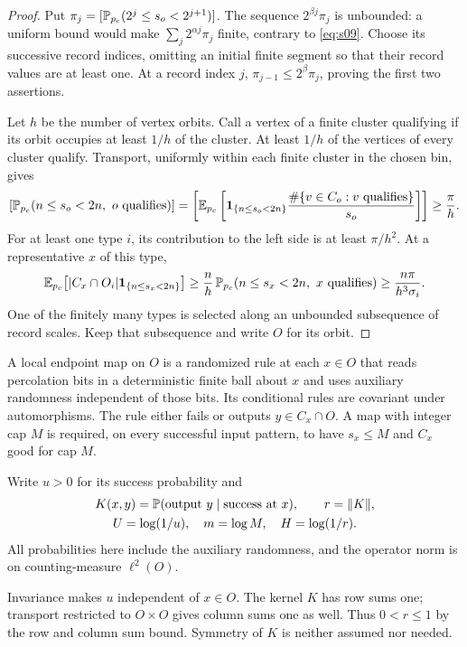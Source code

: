 \begin{proof}
Put $\pi_j=[\mathbb P_{{p_c}}(2^j\le s_o<2^{j+1})]$.  The sequence
$2^{\beta j}\pi_j$ is unbounded: a uniform bound would make
$\sum_j2^{\alpha j}\pi_j$ finite, contrary to \eqref{eq:s09}.
Choose its successive record indices, omitting an initial finite segment
so that their record values are at least one.  At a record index $j$,
$\pi_{j-1}\le2^\beta\pi_j$, proving the first two assertions.

Let $h$ be the number of vertex orbits.  Call a vertex of a finite cluster
qualifying if its orbit occupies at least $1/h$ of the cluster.  At least
$1/h$ of the vertices of every cluster qualify.  Transport, uniformly
within each finite cluster in the chosen bin, gives
\[
 [\mathbb P_{{p_c}}(n\le s_o<2n,\ o\text{ qualifies})]
 =\left[\mathbb E_{{p_c}}\left[
   \mathbf 1_{\{n\le s_o<2n\}}
   \frac{\#\{v\in C_o:v\text{ qualifies}\}}{s_o}\right]\right]
 \ge\frac\pi h.
\]
For at least one type $i$, its contribution to the left side is at least
$\pi/h^2$.  At a representative $x$ of this type,
\[
 \mathbb E_{{p_c}}\bigl[|C_x\cap O_i|\mathbf 1_{\{n\le s_x<2n\}}\bigr]
 \ge \frac n h\,
      \mathbb P_{{p_c}}(n\le s_x<2n,\ x\text{ qualifies})
 \ge \frac{n\pi}{h^3\sigma_i}.
\]
One of the finitely many types is selected along an unbounded subsequence
of record scales.  Keep that subsequence and write $O$ for its orbit.
\end{proof}

\begin{definition}\label{amp:map}
A local endpoint map on $O$ is a randomized rule at each $x\in O$ that
reads percolation bits in a deterministic finite ball about $x$ and uses
auxiliary randomness independent of those bits.  Its conditional rules
are covariant under automorphisms.  The rule either fails or outputs
$y\in C_x\cap O$.  A map with integer cap $M$ is required, on every successful
input pattern, to have $s_x\le M$ and $C_x$ good for cap $M$.

Write $u>0$ for its success probability and
\[
 \begin{gathered}
 K(x,y)=\mathbb P(\text{output }y\mid\text{success at }x),
 \qquad r=\lVert K\rVert,\\
 U=\log(1/u),\quad m=\log M,\quad H=\log(1/r).
 \end{gathered}
\]
All probabilities here include the auxiliary randomness, and the operator
norm is on counting-measure $\ell^2(O)$.
\end{definition}

Invariance makes $u$ independent of $x\in O$.  The kernel $K$ has row sums
one; transport restricted to $O\times O$ gives column sums one as well.
Thus $0<r\le1$ by the row and column sum bound.  Symmetry of $K$ is neither
assumed nor needed.

